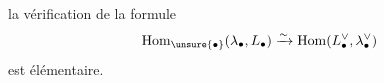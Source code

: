 la vérification de la formule
\[
\operatorname{Hom}_{\unsure{\bullet}}(\lambda_\bullet,L_\bullet)
\xrightarrow{\sim}\operatorname{Hom}(L_\bullet^\vee,\lambda_\bullet^\vee)
\]
est élémentaire.

